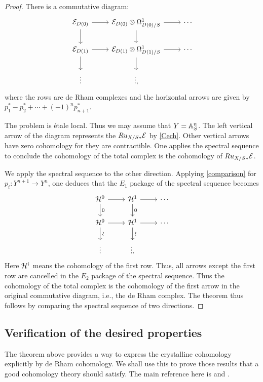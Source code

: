 \begin{proof}
    There is a commutative diagram:
    \[
        \begin{tikzcd}
            \CE_{D(0)} \ar[r]\ar[d] & 
            \CE_{D(0)} \otimes \Omega_{D(0)/S}^1 \ar[r] \ar[d] & \cdots \\
            \CE_{D(1)} \ar[r] \ar[d] & 
            \CE_{D(1)} \otimes \Omega_{D(1)/S}^1 \ar[r] \ar[d] & \cdots \\ 
            \vdots & \vdots,
        \end{tikzcd}
    \]
    where the rows are de Rham complexes 
    and the horizontal arrows are given by 
    $p_1^* - p_2^* + \cdots + (-1)^n p_{n + 1}^*$.

    The problem is \'etale local. 
    Thus we may assume that $Y = {\mathbb {A}}^n_S$. 
    The left vertical arrow of the diagram represents the 
    $Ru_{X/S*} {\mathcal {E}}$ by \ref{Cech}. 
    Other vertical arrows have zero cohomology for they are contractible. 
    One applies the spectral sequence to conclude 
    the cohomology of the total complex 
    is the cohomology of $Ru_{X/S*} {\mathcal {E}}$.

    We apply the spectral sequence to the other direction. 
    Applying \ref{comparison} for $p_i \colon Y^{n+1} \to Y^n$, 
    one deduces that the $E_1$ package of the spectral sequence becomes
    \[
        \begin{tikzcd}
            \CH^0 \ar[r] \ar[d, "0"] & 
            \CH^1 \ar[r] \ar[d, "0"] & \cdots \\
            \CH^0 \ar[r] \ar[d, "\sim" sloped] & 
            \CH^1 \ar[r] \ar[d, "\sim" sloped] & \cdots \\ 
            \vdots & \vdots.
        \end{tikzcd}
    \]
    Here ${\mathcal {H}}^i$ means the cohomology of the first row. 
    Thus, all arrows except the first row are cancelled 
    in the $E_2$ package of the spectral sequence. 
    Thus the cohomology of the total complex is 
    the cohomology of the first arrow in the original commutative diagram, 
    i.e., the de Rham complex. 
    The theorem thus follows by comparing the spectral sequence of two directions.
\end{proof}

\subsection{Verification of the desired properties}
The theorem above provides a way to express the crystalline cohomology 
explicitly by de Rham cohomology. 
We shall use this to prove those results 
that a good cohomology theory should satisfy. 
The main reference here is \cite{BO} and \cite{Be2}.

